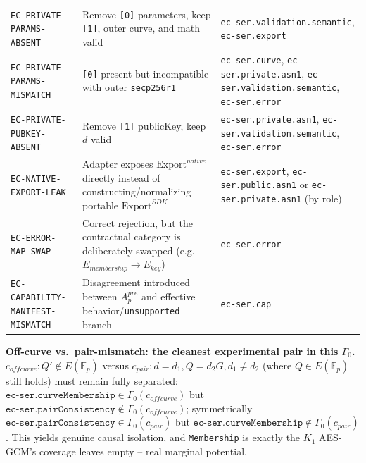 \documentclass[11pt,a4paper]{article}
\begin{document}
\begin{longtable}{p{}p{}p{}}
\texttt{EC-PRIVATE-PARAMS-ABSENT} & Remove \texttt{[0]} parameters, keep \texttt{[1]}, outer curve, and math valid & \texttt{ec-ser.validation.semantic}, \texttt{ec-ser.export}\\

\texttt{EC-PRIVATE-PARAMS-MISMATCH} & \texttt{[0]} present but incompatible with outer \texttt{secp256r1} & \texttt{ec-ser.curve}, \texttt{ec-ser.private.asn1}, \texttt{ec-ser.validation.semantic}, \texttt{ec-ser.error}\\

\texttt{EC-PRIVATE-PUBKEY-ABSENT} & Remove \texttt{[1]} publicKey, keep $d$ valid & \texttt{ec-ser.private.asn1}, \texttt{ec-ser.validation.semantic}, \texttt{ec-ser.error}\\

\texttt{EC-NATIVE-EXPORT-LEAK} & Adapter exposes $\text{Export}^{native}$ directly instead of constructing/normalizing portable $\text{Export}^{SDK}$ & \texttt{ec-ser.export}, \texttt{ec-ser.public.asn1} or \texttt{ec-ser.private.asn1} (by role)\\

\texttt{EC-ERROR-MAP-SWAP} & Correct rejection, but the contractual category is deliberately swapped (e.g.\ $E_{membership}\to E_{key}$) & \texttt{ec-ser.error}\\

\texttt{EC-CAPABILITY-MANIFEST-MISMATCH} & Disagreement introduced between $A_p^{pre}$ and effective behavior/\texttt{unsupported} branch & \texttt{ec-ser.cap}\\

\end{longtable}

\textbf{Off-curve vs.\ pair-mismatch: the cleanest experimental pair in this $\Gamma_0$.} $c_{offcurve}: Q'\notin E(\mathbb{F}_p)$ versus $c_{pair}: d=d_1, Q=d_2G, d_1\neq d_2$ (where $Q\in E(\mathbb{F}_p)$ still holds) must remain fully separated: $\texttt{ec-ser.curveMembership}\in\Gamma_0(c_{offcurve})$ but $\texttt{ec-ser.pairConsistency}\notin\Gamma_0(c_{offcurve})$; symmetrically $\texttt{ec-ser.pairConsistency}\in\Gamma_0(c_{pair})$ but $\texttt{ec-ser.curveMembership}\notin\Gamma_0(c_{pair})$. This yields genuine causal isolation, and \texttt{Membership} is exactly the $K_1$ AES-GCM's coverage leaves empty -- real marginal potential.
\end{document}
